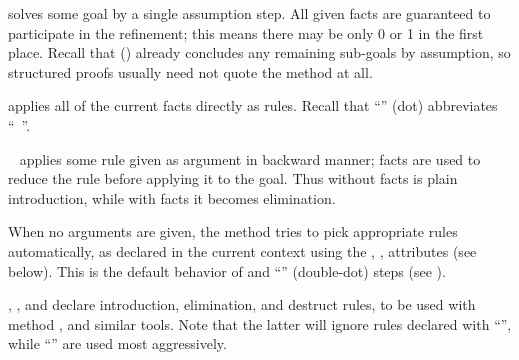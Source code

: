 \begin{isabellebody}
\begin{isamarkuptext}
\begin{description}
  \item \hyperlink{method.assumption}{\mbox{}} solves some goal by a single assumption
  step.  All given facts are guaranteed to participate in the
  refinement; this means there may be only 0 or 1 in the first place.
  Recall that \hyperlink{command.qed}{\mbox{}} () already
  concludes any remaining sub-goals by assumption, so structured
  proofs usually need not quote the \hyperlink{method.assumption}{\mbox{}} method at
  all.
  
  \item \hyperlink{method.this}{\mbox{}} applies all of the current facts directly as
  rules.  Recall that ``\hyperlink{command.dot}{\mbox{}}'' (dot) abbreviates ``\hyperlink{command.by}{\mbox{}}~''.
  
  \item \hyperlink{method.Pure.rule}{\mbox{}}~ applies some rule given as
  argument in backward manner; facts are used to reduce the rule
  before applying it to the goal.  Thus \hyperlink{method.Pure.rule}{\mbox{}} without facts
  is plain introduction, while with facts it becomes elimination.
  
  When no arguments are given, the \hyperlink{method.Pure.rule}{\mbox{}} method tries to pick
  appropriate rules automatically, as declared in the current context
  using the \hyperlink{attribute.Pure.intro}{\mbox{}}, \hyperlink{attribute.Pure.elim}{\mbox{}},
  \hyperlink{attribute.Pure.dest}{\mbox{}} attributes (see below).  This is the
  default behavior of \hyperlink{command.proof}{\mbox{}} and ``\hyperlink{command.ddot}{\mbox{}}'' 
  (double-dot) steps (see ).
  
  \item \hyperlink{attribute.Pure.intro}{\mbox{}}, \hyperlink{attribute.Pure.elim}{\mbox{}}, and
  \hyperlink{attribute.Pure.dest}{\mbox{}} declare introduction, elimination, and
  destruct rules, to be used with method \hyperlink{method.Pure.rule}{\mbox{}}, and similar
  tools.  Note that the latter will ignore rules declared with
  ``'', while ``''  are used most aggressively.
  

\end{description}
\end{isamarkuptext}
\end{isabellebody}
